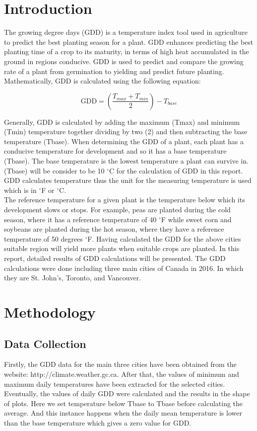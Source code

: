 \documentclass{article}
\begin{document}
\section{ \bf Introduction}
The growing degree days (GDD) is a temperature index tool used in agriculture to predict the best planting season for a plant. GDD enhances predicting the best planting time of a crop to its maturity, in terms of high heat accumulated in the ground in regions conducive. GDD is used to predict and compare the growing rate of a plant from germination to yielding and predict future planting.
Mathematically, GDD is calculated using the following equation:


\begin{equation}
\textrm{GDD} = \left(\frac{T_{max} + T_{min}}{2}\right) - T_{base}
\label{eqn:gdd}
\end{equation}

\noindent 
Generally, GDD is calculated by adding the maximum (Tmax) and minimum (Tmin) temperature together dividing by two (2) and then subtracting the base temperature (Tbase). 
When determining the GDD of a plant, each plant has a conducive temperature for development and so it has a base temperature (Tbase). The base temperature is the lowest temperature a plant can survive in. (Tbase) will be consider to be 10 $^{\circ}$C for the calculation of GDD in this report.
GDD calculates temperature thus the unit for the measuring temperature is used which is in $^{\circ}$F or $^{\circ}$C. \\
The reference temperature for a given plant is the temperature below which its development slows or stops. For example, peas are planted during the cold season, where it has a reference temperature of 40  $^{\circ}$F while sweet corn and soybeans are planted during the hot season, where they have a reference temperature of 50 degrees  $^{\circ}$F.
Having calculated the GDD for the above cities suitable region will yield more plants when suitable crops are planted.
In this report, detailed results of GDD calculations will be presented. The GDD calculations were done including three main cities of Canada in 2016. In which they are St. John’s, Toronto, and Vancouver.



\section{ \bf Methodology}
\subsection{Data Collection}
Firstly, the GDD data for the main three cities have been obtained from the website: http://climate.weather.gc.ca. After that, the values of minimum and maximum daily temperatures have been extracted for the selected cities. Eventually, the values of daily GDD were calculated and the results in the shape of plots. Here we set temperature below Tbase to Tbase before calculating the average. And this instance happens when the daily mean temperature is lower than the base temperature which gives a zero value for GDD. 
\end{document}
